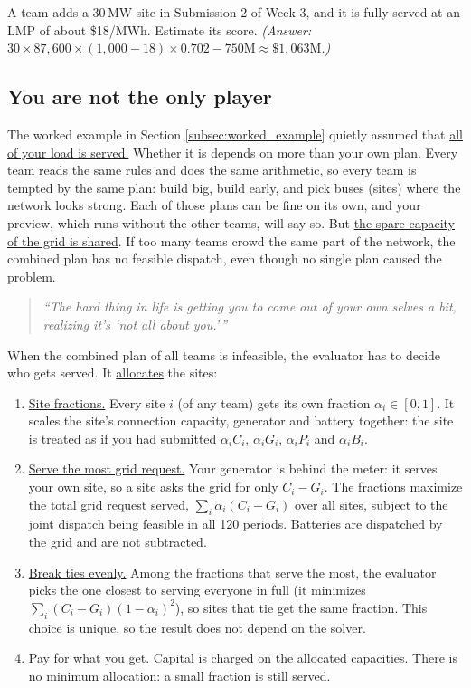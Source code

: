 \documentclass[10pt]{article}
\newcommand{\alert}[1]{{\color{alertblue}\uline{#1}}}
\newcommand{\MW}{\ensuremath{\,\mathrm{MW}}}
\begin{document}
\begin{exercisebox}
A team adds a 30\MW{} site in Submission 2 of Week 3, and it is fully served
at an LMP of about \$18/MWh. Estimate its score. \emph{(Answer:
$30 \times 87{,}600 \times (1{,}000 - 18) \times 0.702 - 750\text{M} \approx \$1{,}063\text{M}$.)}
\end{exercisebox}

\subsection{You are not the only player}\label{sec:projection}
The worked example in Section \ref{subsec:worked_example} quietly assumed that \alert{all of your load is served.} Whether it is depends on more than your own plan. Every team reads the same rules and does
the same arithmetic, so every team is tempted by the same plan: build big,
build early, and pick buses (sites) where the network looks strong. Each of those plans
can be fine on its own, and your preview, which runs without the other teams,
will say so. But \alert{the spare capacity of the grid is shared}. If too many teams
crowd the same part of the network, the combined plan has no feasible dispatch,
even though no single plan caused the problem.

\begin{quote}
\itshape ``The hard thing in life is getting you to come out of your own selves
a bit, realizing it's `not all about you.'\,''
\end{quote}

When the combined plan of all teams is infeasible, the evaluator has to decide who gets
served. It \alert{allocates} the sites:
\begin{enumerate}[leftmargin=*]
  \item \alert{Site fractions.} Every site $i$ (of any team) gets its own
    fraction $\alpha_i \in [0,1]$. It scales the site's connection capacity,
    generator and battery together: the site is treated as if you had
    submitted $\alpha_i C_i$, $\alpha_i G_i$, $\alpha_i P_i$ and $\alpha_i B_i$.
  \item \alert{Serve the most grid request.} Your generator is behind the
    meter: it serves your own site, so a site asks the grid for only
    $C_i - G_i$. The fractions maximize the total grid request served,
    $\sum_i \alpha_i (C_i - G_i)$ over all sites, subject to the joint
    dispatch being feasible in all 120 periods. Batteries are dispatched by
    the grid and are not subtracted.
  \item \alert{Break ties evenly.} Among the fractions that serve the most,
    the evaluator picks the one closest to serving everyone in full (it
    minimizes $\sum_i (C_i - G_i)(1-\alpha_i)^2$), so sites that tie get the
    same fraction. This choice is unique, so the result does not depend on
    the solver.
  \item \alert{Pay for what you get.} Capital is charged on the allocated
    capacities. There is no minimum allocation: a small fraction is still
    served.
\end{enumerate}
\end{document}
